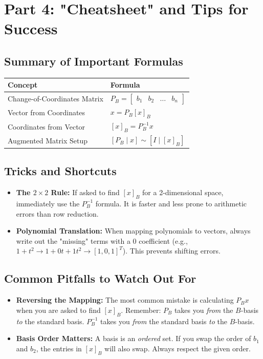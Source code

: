 \documentclass[11pt]{article}
\begin{document}
\newpage
\section{Part 4: "Cheatsheet" and Tips for Success}

\subsection{Summary of Important Formulas}
\begin{table}[h]
\centering
\begin{tabular}{ll}
\toprule
\textbf{Concept} & \textbf{Formula} \\
\midrule
Change-of-Coordinates Matrix & $P_B = \begin{bmatrix} b_1 & b_2 & \dots & b_n \end{bmatrix}$ \\
Vector from Coordinates & $x = P_B [x]_B$ \\
Coordinates from Vector & $[x]_B = P_B^{-1} x$ \\
Augmented Matrix Setup & $[P_B \mid x] \sim [I \mid [x]_B]$ \\
\bottomrule
\end{tabular}
\end{table}

\subsection{Tricks and Shortcuts}
\begin{itemize}
    \item \textbf{The $2 \times 2$ Rule:} If asked to find $[x]_B$ for a 2-dimensional space, immediately use the $P_B^{-1}$ formula. It is faster and less prone to arithmetic errors than row reduction.
    \item \textbf{Polynomial Translation:} When mapping polynomials to vectors, always write out the "missing" terms with a $0$ coefficient (e.g., $1+t^2 \to 1 + 0t + 1t^2 \to [1, 0, 1]^T$). This prevents shifting errors.
\end{itemize}

\subsection{Common Pitfalls to Watch Out For}
\begin{itemize}
    \item \textbf{Reversing the Mapping:} The most common mistake is calculating $P_B x$ when you are asked to find $[x]_B$. Remember: $P_B$ takes you \textit{from} the $B$-basis \textit{to} the standard basis. $P_B^{-1}$ takes you \textit{from} the standard basis \textit{to} the $B$-basis.
    \item \textbf{Basis Order Matters:} A basis is an \textit{ordered} set. If you swap the order of $b_1$ and $b_2$, the entries in $[x]_B$ will also swap. Always respect the given order.
\end{itemize}
\end{document}
